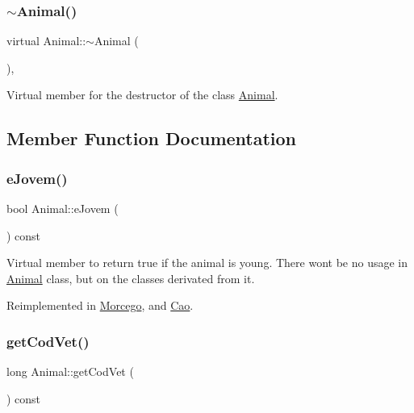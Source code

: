 \subsubsection{\texorpdfstring{$\sim$\+Animal()}{~Animal()}}
{\footnotesize\ttfamily virtual Animal\+::$\sim$\+Animal (\begin{DoxyParamCaption}{ }\end{DoxyParamCaption})\hspace{0.3cm}{\ttfamily [inline]}, {\ttfamily [virtual]}}

Virtual member for the destructor of the class \mbox{\hyperlink{class_animal}{Animal}}. 

\subsection{Member Function Documentation}
\mbox{\label{class_animal_a13862612b8bcf972d764b0ef81b66324}} 
\subsubsection{\texorpdfstring{e\+Jovem()}{eJovem()}}
{\footnotesize\ttfamily bool Animal\+::e\+Jovem (\begin{DoxyParamCaption}{ }\end{DoxyParamCaption}) const\hspace{0.3cm}{\ttfamily [virtual]}}

Virtual member to return true if the animal is young. There won\textquotesingle{}t be no usage in \mbox{\hyperlink{class_animal}{Animal}} class, but on the classes derivated from it. 

Reimplemented in \mbox{\hyperlink{class_morcego_a529bc1b0f9557b0b015dd517bad62ebc}{Morcego}}, and \mbox{\hyperlink{class_cao_afb98e22384401fa1c3b44537b5e28352}{Cao}}.

\mbox{\label{class_animal_a8958667f21bf10093ab6047deabaf341}} 
\subsubsection{\texorpdfstring{get\+Cod\+Vet()}{getCodVet()}}
{\footnotesize\ttfamily long Animal\+::get\+Cod\+Vet (\begin{DoxyParamCaption}{ }\end{DoxyParamCaption}) const}

